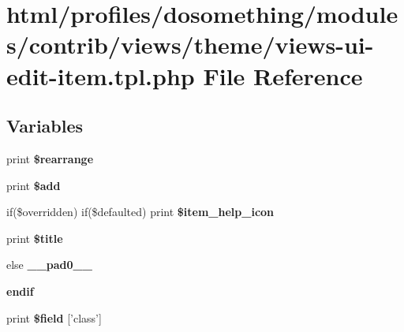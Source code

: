 \hypertarget{views-ui-edit-item_8tpl_8php}{
\section{html/profiles/dosomething/modules/contrib/views/theme/views-\/ui-\/edit-\/item.tpl.php File Reference}
\label{views-ui-edit-item_8tpl_8php}
}
\subsection*{Variables}
\begin{DoxyCompactItemize}
\item 
\hypertarget{views-ui-edit-item_8tpl_8php_ab15f37c8688b5a7c04422b0217148d94}{
print {\bfseries \$rearrange}}
\label{views-ui-edit-item_8tpl_8php_ab15f37c8688b5a7c04422b0217148d94}

\item 
\hypertarget{views-ui-edit-item_8tpl_8php_a171274f668d4a8f1c92ff17bfb52f9b6}{
print {\bfseries \$add}}
\label{views-ui-edit-item_8tpl_8php_a171274f668d4a8f1c92ff17bfb52f9b6}

\item 
\hypertarget{views-ui-edit-item_8tpl_8php_a329ac17389e1d631fa908a22a788fe2f}{
if(\$overridden) if(\$defaulted) print {\bfseries \$item\_\-help\_\-icon}}
\label{views-ui-edit-item_8tpl_8php_a329ac17389e1d631fa908a22a788fe2f}

\item 
\hypertarget{views-ui-edit-item_8tpl_8php_aec2795512d255332f57cacd930a090b4}{
print {\bfseries \$title}}
\label{views-ui-edit-item_8tpl_8php_aec2795512d255332f57cacd930a090b4}

\item 
\hypertarget{views-ui-edit-item_8tpl_8php_a8e01dcc96c43199448ee66f7c2ae8ea6}{
else {\bfseries \_\-\_\-pad0\_\-\_\-}}
\label{views-ui-edit-item_8tpl_8php_a8e01dcc96c43199448ee66f7c2ae8ea6}

\item 
\hypertarget{views-ui-edit-item_8tpl_8php_a82cd33ca97ff99f2fcc5e9c81d65251b}{
{\bfseries endif}}
\label{views-ui-edit-item_8tpl_8php_a82cd33ca97ff99f2fcc5e9c81d65251b}

\item 
\hypertarget{views-ui-edit-item_8tpl_8php_a5140a47de84029c7f8344a3a97fb7bce}{
print {\bfseries \$field} \mbox{[}'class'\mbox{]}}
\label{views-ui-edit-item_8tpl_8php_a5140a47de84029c7f8344a3a97fb7bce}


\end{DoxyCompactItemize}
